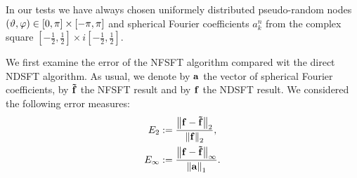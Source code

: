 In our tests we have always chosen uniformely distributed pseudo-random 
nodes $\left(\vartheta,\varphi\right) \in [0,\pi] \times [-\pi,\pi]$ and 
spherical Fourier coefficients $a_{k}^n$ from the complex square
$\left[-\frac{1}{2},\frac{1}{2}\right] \times 
i\left[-\frac{1}{2},\frac{1}{2}\right]$.

We first examine the error of the NFSFT algorithm compared wit the direct NDSFT
algorithm. As usual, we denote by $\mathbf{a}$ the vector of
spherical Fourier coefficients, by $\mathbf{\tilde{f}}$ the NFSFT result and
by $\mathbf{f}$ the NDSFT result. We considered the following error measures:
\begin{align*}
  E_{2} & := \frac{\left\|\mathbf{f}-\mathbf{\tilde{f}}\right\|_{2}}{\left\|\mathbf{f}\right\|_{2}},\\
  E_{\infty} & := \frac{\left\|\mathbf{f}-\mathbf{\tilde{f}}\right\|_{\infty}}{\left\|\mathbf{a}\right\|_{1}}.
\end{align*}

